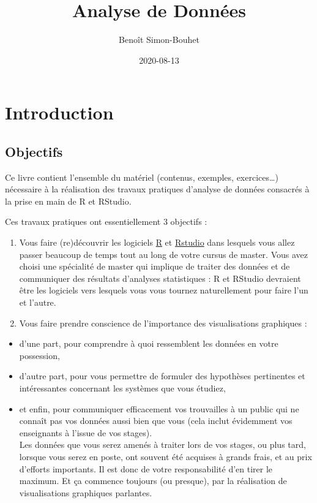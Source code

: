 \documentclass[
  a4paper,
]{article}
\title{Analyse de Données}
\author{Benoît Simon-Bouhet}
\date{2020-08-13}
\providecommand{\tightlist}{%
  \setlength{\itemsep}{0pt}\setlength{\parskip}{0pt}}
\begin{document}
\maketitle

{
\hypersetup{linkcolor=}
\setcounter{tocdepth}{2}
\tableofcontents
}
\hypertarget{introduction}{%
\section{Introduction}\label{introduction}}

\hypertarget{objectifs}{%
\subsection{Objectifs}\label{objectifs}}

Ce livre contient l'ensemble du matériel (contenus, exemples, exercices\ldots) nécessaire à la réalisation des travaux pratiques d'analyse de données consacrés à la prise en main de R et RStudio.

Ces travaux pratiques ont essentiellement 3 objectifs :

\begin{enumerate}
\def\labelenumi{\arabic{enumi}.}
\tightlist
\item
  Vous faire (re)découvrir les logiciels \href{https://cran.r-project.org}{R} et \href{https://www.rstudio.com}{Rstudio} dans lesquels vous allez passer beaucoup de temps tout au long de votre cursus de master. Vous avez choisi une spécialité de master qui implique de traiter des données et de communiquer des résultats d'analyses statistiques : R et RStudio devraient être les logiciels vers lesquels vous vous tournez naturellement pour faire l'un et l'autre.
\item
  Vous faire prendre conscience de l'importance des visualisations graphiques :
\end{enumerate}

\begin{itemize}
\tightlist
\item
  d'une part, pour comprendre à quoi ressemblent les données en votre possession,
\item
  d'autre part, pour vous permettre de formuler des hypothèses pertinentes et intéressantes concernant les systèmes que vous étudiez,
\item
  et enfin, pour communiquer efficacement vos trouvailles à un public qui ne connaît pas vos données aussi bien que vous (cela inclut évidemment vos enseignants à l'issue de vos stages).\\
  Les données que vous serez amenés à traiter lors de vos stages, ou plus tard, lorsque vous serez en poste, ont souvent été acquises à grands frais, et au prix d'efforts importants. Il est donc de votre responsabilité d'en tirer le maximum. Et ça commence toujours (ou presque), par la réalisation de visualisations graphiques parlantes.
\end{itemize}
\end{document}
